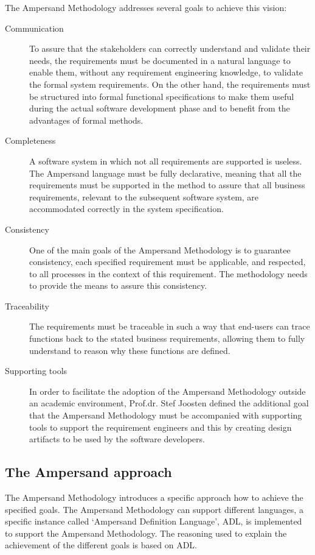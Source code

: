 The Ampersand Methodology addresses several goals to achieve this vision:
\begin{description}
	\item[Communication]  To assure that the stakeholders can correctly understand and validate their needs, the requirements must be documented in a natural language to enable them, without any requirement engineering knowledge, to validate the formal system requirements. On the other hand, the requirements must be structured into formal  functional specifications to make them useful during the actual software development phase and to benefit from the advantages of formal methods. 
	\item[Completeness]A software system in which not all requirements are supported is useless. The Ampersand language must be fully declarative, meaning that all the requirements must be supported in the method to assure that all business requirements, relevant to the subsequent software system, are accommodated correctly in the system specification.
	\item[Consistency]One of the main goals of the Ampersand Methodology is to guarantee consistency, each specified requirement must be applicable, and respected, to all processes in the context of this requirement. The methodology needs to provide the means to assure this consistency.
	\item[Traceability] The requirements must be traceable in such a way that end-users can trace  functions back to the stated business requirements, allowing them to fully understand to reason why these functions are defined.
	\item[Supporting tools] In order to facilitate the adoption of the Ampersand Methodology outside an academic environment, Prof.dr. Stef Joosten defined the additional goal that the Ampersand Methodology must be accompanied with supporting tools to support the requirement engineers and this by creating design artifacts to be used by the software developers.
\end{description}

\subsection{The Ampersand approach}
The Ampersand Methodology introduces a specific approach how to achieve the specified goals. The Ampersand Methodology can support different languages, a specific instance called `Ampersand Definition Language', ADL, is implemented to support the Ampersand Methodology.
The reasoning used to explain the achievement of the different goals is based on ADL.


